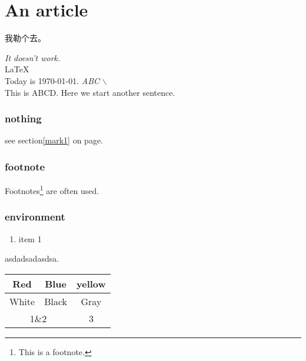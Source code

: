 \documentclass[10pt,a4paper]{article}
\author{Liu Boyuan}
\begin{document}
\part{An article}
\begin{CJK}{UTF8}{song}
我勒个去。\\
\end{CJK}
\emph{It doesn't work.}\\
\LaTeX\\
Today is \today.
\textsl{ABC}%
$\backslash$%
\texteuro\textdollar\textyen \\
This is ABCD\@. Here we start another sentence.\\
\label{mark1} %
\section*{nothing}%
see section\ref{mark1} on page\pageref{mark1}.
\section{footnote}%
Footnotes\footnote{This is a footnote.} are often used.\\

\section{environment}

\begin{enumerate}
\item[]item 1
\end{enumerate}

\begin{flushleft}
asdadsadasdsa.
\end{flushleft}


\begin{tabular}{c@{***}c|c} %
\hline %
Red&Blue&yellow\\
\hline
White&Black&Gray\\
\hline
\multicolumn{2}{c}{1\&2}&3\\ %
\hline
\end{tabular}
\end{document}
